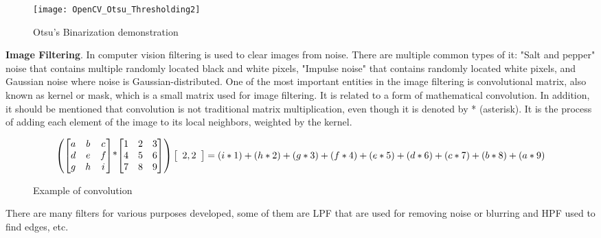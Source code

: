 \documentclass[../../../../main]{subfiles}
\begin{document}
\begin{figure} [!ht]
\begin{center}
\texttt{[image: OpenCV\_Otsu\_Thresholding2]}
\caption{Otsu's Binarization demonstration}
\label{fig:otsuThresholding}
\end{center}
\end{figure}

\textbf{Image Filtering}. In computer vision filtering is used to clear images from noise. There are multiple common types of it: "Salt and pepper" noise that contains multiple randomly located black and white pixels, "Impulse noise" that contains randomly located white pixels, and Gaussian noise where noise is Gaussian-distributed.
One of the most important entities in the image filtering is convolutional matrix, also known as kernel or mask, which is a small matrix used for image filtering. It is related to a form of mathematical convolution. In addition, it should be mentioned that convolution is not traditional matrix multiplication, even though it is denoted by * (asterisk). It is the process of adding each element of the image to its local neighbors, weighted by the kernel. 

\begin{figure} [!ht]
  \centering    
    \begin{equation}
        \begin{pmatrix} 
           \begin{bmatrix} 
               a & b & c \\ 
               d & e & f \\
               g & h & i
           \end{bmatrix}
           $*$
           \begin{bmatrix} 
               1 & 2 & 3 \\ 
               4 & 5 & 6 \\
               7 & 8 & 9
           \end{bmatrix}
        \end{pmatrix}
        \left[ \begin{array}{cc} 2, 2 \end{array} \right] = (i*1) + (h*2) + (g*3) + (f*4) + \\ (e*5)+ (d*6) + (c*7) + (b*8) + (a*9)
    \end{equation}
  \caption{Example of convolution}
\end{figure}

There are many filters for various purposes developed, some of them are \ac{LPF} that are used for removing noise or blurring and \ac{HPF} used to find edges, etc.
\end{document}
